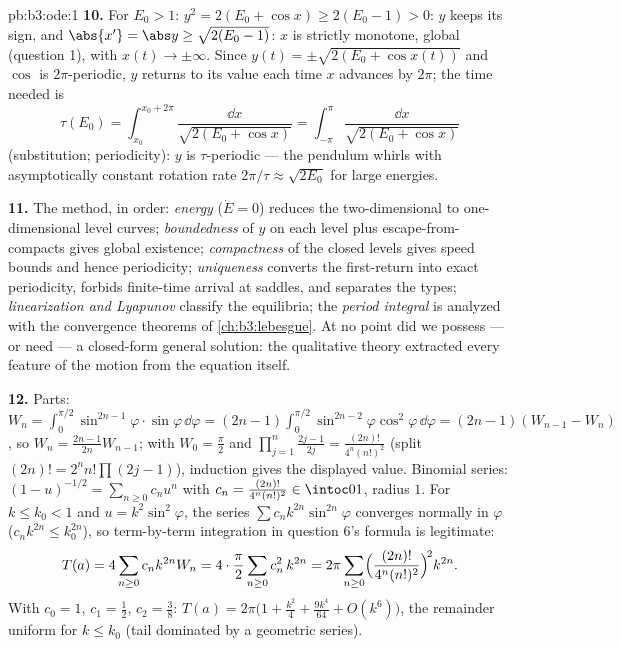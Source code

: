 \begin{solution}{pb:b3:ode:1}
\textbf{10.} For $E_0 > 1$: $y^2 = 2(E_0 + \cos x) \geq
2(E_0 - 1) > 0$: $y$ keeps its sign, and $\abs{x'} = \abs y
\geq \sqrt{2(E_0 - 1)}$: $x$ is strictly monotone, global
(question 1), with $x(t) \to \pm\infty$. Since $y(t) =
\pm\sqrt{2(E_0 + \cos x(t))}$ and $\cos$ is $2\pi$-periodic,
$y$ returns to its value each time $x$ advances by $2\pi$;
the time needed is
\[
\tau(E_0) = \int_{x_0}^{x_0 + 2\pi}\frac{\dd
x}{\sqrt{2(E_0 + \cos x)}} =
\int_{-\pi}^{\pi}\frac{\dd x}{\sqrt{2(E_0 + \cos x)}}
\]
(substitution; periodicity): $y$ is $\tau$-periodic ---
the pendulum whirls with asymptotically constant rotation
rate $2\pi/\tau \approx \sqrt{2E_0}$ for large energies.

\textbf{11.} The method, in order: \emph{energy} ($\dot E =
0$) reduces the two-dimensional  to one-dimensional
level curves; \emph{boundedness} of $y$ on each level plus
escape-from-compacts gives global existence;
\emph{compactness} of the closed levels gives speed bounds
and hence periodicity; \emph{uniqueness} converts the
first-return into exact periodicity, forbids finite-time
arrival at saddles, and separates the  types;
\emph{linearization and Lyapunov} classify the equilibria;
the \emph{period integral} is analyzed with the convergence
theorems of \cref{ch:b3:lebesgue}. At no point did we
possess --- or need --- a closed-form general solution: the
qualitative theory extracted every feature of the motion
from the equation itself.

\textbf{12.} Parts: $W_n = \int_0^{\pi/2}\sin^{2n-1}\varphi
\cdot\sin\varphi\,\dd\varphi = (2n-1)\int_0^{\pi/2}
\sin^{2n-2}\varphi\cos^2\varphi\,\dd\varphi = (2n-1)(W_{n-1}
- W_n)$, so $W_n = \frac{2n-1}{2n}W_{n-1}$; with $W_0 =
\frac\pi2$ and $\prod_{j=1}^n\frac{2j-1}{2j} =
\frac{(2n)!}{4^n(n!)^2}$ (split $(2n)! = 2^nn!\prod(2j-1)$),
induction gives the displayed value. Binomial series: $(1 -
u)^{-1/2} = \sum_{n\geq0}c_nu^n$ with $c_n =
\frac{(2n)!}{4^n(n!)^2} \in \intoc01$, radius $1$. For $k
\leq k_0 < 1$ and $u = k^2\sin^2\varphi$, the series
$\sum c_nk^{2n}\sin^{2n}\varphi$ converges normally in
$\varphi$ ($c_nk^{2n} \leq k_0^{2n}$), so term-by-term
integration in question 6's formula is legitimate:
\[
T(a) = 4\sum_{n\geq0}c_nk^{2n}W_n
= 4\cdot\frac\pi2\sum_{n\geq0}c_n^2\,k^{2n}
= 2\pi\sum_{n\geq0}
\Bigl(\frac{(2n)!}{4^n(n!)^2}\Bigr)^{\!2}k^{2n} .
\]
With $c_0 = 1$, $c_1 = \frac12$, $c_2 = \frac38$: $T(a) =
2\pi\bigl(1 + \frac{k^2}4 + \frac{9k^4}{64} + O(k^6)\bigr)$,
the remainder uniform for $k \leq k_0$ (tail dominated by a
geometric series).


\end{solution}

